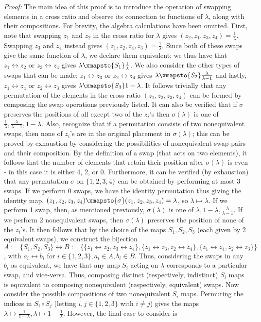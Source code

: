 \textit{Proof: } The main idea of this proof is to introduce the operation of swapping elements in a cross ratio and observe its connection to functions of $\lambda$, along with their compositions. For brevity, the algebra calculations have been omitted. First, note that swapping $z_1$ and $z_2$ in the cross ratio for $\lambda$ gives $(z_2,z_1,z_3,z_4) = \frac{1}{\lambda}$. Swapping $z_3$ and $z_4$ instead gives $(z_1,z_2,z_4,z_3) = \frac{1}{\lambda}$. Since both of these swaps give the same function of $\lambda$, we declare them equivalent; we thus have that $z_1 \leftrightarrow z_2$ or $z_3 \leftrightarrow z_4$ gives $\lambda \xmapsto{S_1} \frac{1}{\lambda}$. We also consider the other types of swaps that can be made: $z_1 \leftrightarrow z_3$ or $z_2 \leftrightarrow z_4$ gives $\lambda \xmapsto{S_2} \frac{\lambda}{\lambda - 1}$ and lastly, $z_1 \leftrightarrow z_4$ or $z_2 \leftrightarrow z_3$ gives $\lambda \xmapsto{S_3} 1 - \lambda$. It follows trivially that any permutation of the elements in the cross ratio $(z_1,z_2,z_3,z_4)$ can be formed by composing the swap operations previously listed. It can also be verified that if $\sigma$ preserves the positions of all except two of the $z_i$'s then $\sigma(\lambda)$ is one of $\frac{1}{\lambda}, \frac{\lambda}{\lambda - 1}, 1 - \lambda$. Also, recognize that if a permutation consists of two nonequivalent swaps, then none of $z_i$'s are in the original placement in $\sigma(\lambda)$; this can be proved by exhaustion by considering the possibilities of nonequivalent swap pairs and their composition. By the definition of a swap (that acts on two elements), it follows that the number of elements that retain their position after $\sigma(\lambda)$ is even - in this case it is either 4, 2, or 0. Furthermore, it can be verified (by exhaustion) that any permutation $\sigma$ on $\{1,2,3,4\}$ can be obtained by performing at most 3 swaps. If we perform 0 swaps, we have the identity permutation thus giving the identity map, $(z_1,z_2,z_3,z_4) \xmapsto{\sigma} (z_1,z_2,z_3,z_4) = \lambda$, so $\lambda \mapsto \lambda$. If we perform 1 swap, then, as mentioned previously, $\sigma(\lambda)$ is one of $\lambda, 1-\lambda, \frac{\lambda}{\lambda - 1}$. If we perform 2 nonequivalent swaps, then $\sigma(\lambda)$ preserves the position of none of the $z_i$'s. It then follows that by the choice of the maps $S_1,S_2,S_3$ (each given by 2 equivalent swaps), we construct the bijection $A:= \{S_1,S_2,S_3\} \longleftrightarrow B:= \{\{z_1 \leftrightarrow z_2, z_3 \leftrightarrow z_4\}, \{z_1 \leftrightarrow z_3, z_2 \leftrightarrow z_4\}, \{z_1 \leftrightarrow z_4, z_2 \leftrightarrow z_3\}\}$, with $a_i \longleftrightarrow b_i$ for $i \in \{1,2,3\}, a_i \in A, b_i \in B$. Thus, considering the swaps in any $b_i$ as equivalent, we have that any map $S_i$ acting on $\lambda$ corresponds to a particular swap, and vice-versa. Thus, composing distinct (respectively, indistinct) $S_i$ maps is equivalent to composing nonequivalent (respectively, equivalent) swaps. Now consider the possible compositions of two nonequivalent $S_i$ maps. Permuting the indices in $S_i \circ S_j$ (letting $i,j \in \{1,2,3\}$ with $i \neq j$) gives the maps $\lambda \mapsto \frac{1}{1 - \lambda}, \lambda \mapsto 1 - \frac{1}{\lambda}$. However, the final case to consider is 